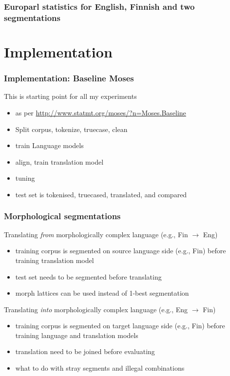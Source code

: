 \documentclass{beamer}
\begin{document}
\begin{frame}
    \frametitle{Europarl statistics for English, Finnish and two segmentations}
\end{frame}

\section{Implementation}

\begin{frame}
    \frametitle{Implementation: Baseline Moses}
    This is starting point for all my experiments
    \begin{itemize}
        \item as per \url{http://www.statmt.org/moses/?n=Moses.Baseline}
        \item Split corpus, tokenize, truecase, clean
        \item train Language models
        \item align, train translation model
        \item tuning
        \item test set is tokenised, truecased, translated, and compared
    \end{itemize}
\end{frame}

\begin{frame}
    \frametitle{Morphological segmentations}
Translating \emph{from} morphologically complex language (e.g., Fin $\rightarrow$ Eng)
    \begin{itemize}
        \item training corpus is segmented on source language side (e.g., Fin)
            before training translation model
        \item test set needs to be segmented before translating
        \item morph lattices can be used instead of 1-best segmentation
    \end{itemize}
    Translating \emph{into} morphologically complex language (e.g., Eng $\rightarrow$ Fin)
    \begin{itemize}
        \item training corpus is segmented on target language side (e.g., Fin)
            before training language and translation models 
        \item translation need to be joined before evaluating
        \item what to do with stray segments and illegal combinations
    \end{itemize}
\end{frame}
\end{document}
